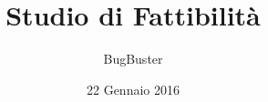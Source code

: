 



\title{\textbf{Studio di Fattibilit\`a}}
\author{BugBuster}

\date{22 Gennaio 2016}




\makeFrontPage

\tableofcontents
\listoffigures
\listoftables





